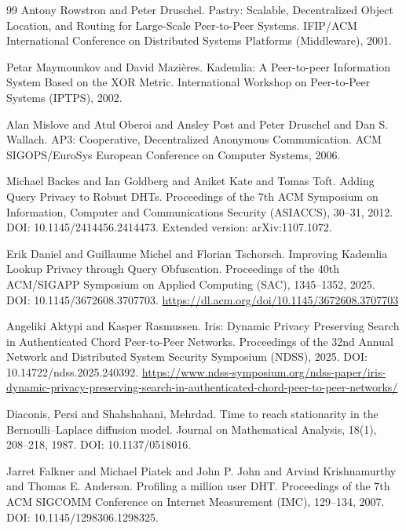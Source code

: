 \documentclass[11pt]{article}
\begin{document}
\begin{thebibliography}{99}
Antony Rowstron and Peter Druschel.
\newblock Pastry: Scalable, Decentralized Object Location, and Routing for Large-Scale Peer-to-Peer Systems.
\newblock IFIP/ACM International Conference on Distributed Systems Platforms (Middleware), 2001.

Petar Maymounkov and David Mazi{\`e}res.
\newblock Kademlia: A Peer-to-peer Information System Based on the XOR Metric.
\newblock International Workshop on Peer-to-Peer Systems (IPTPS), 2002.

Alan Mislove and Atul Oberoi and Ansley Post and Peter Druschel and Dan S. Wallach.
\newblock AP3: Cooperative, Decentralized Anonymous Communication.
\newblock ACM SIGOPS/EuroSys European Conference on Computer Systems, 2006.

Michael Backes and Ian Goldberg and Aniket Kate and Tomas Toft.
\newblock Adding Query Privacy to Robust DHTs.
\newblock Proceedings of the 7th ACM Symposium on Information, Computer and Communications Security (ASIACCS), 30--31, 2012.
\newblock DOI: 10.1145/2414456.2414473.
\newblock Extended version: arXiv:1107.1072.

Erik Daniel and Guillaume Michel and Florian Tschorsch.
\newblock Improving {Kademlia} Lookup Privacy through Query Obfuscation.
\newblock Proceedings of the 40th {ACM}/{SIGAPP} Symposium on Applied Computing (SAC), 1345--1352, 2025.
\newblock DOI: 10.1145/3672608.3707703.
\newblock \url{https://dl.acm.org/doi/10.1145/3672608.3707703}

Angeliki Aktypi and Kasper Rasmussen.
\newblock Iris: Dynamic Privacy Preserving Search in Authenticated Chord Peer-to-Peer Networks.
\newblock Proceedings of the 32nd Annual Network and Distributed System Security Symposium (NDSS), 2025.
\newblock DOI: 10.14722/ndss.2025.240392.
\newblock \url{https://www.ndss-symposium.org/ndss-paper/iris-dynamic-privacy-preserving-search-in-authenticated-chord-peer-to-peer-networks/}

Diaconis, Persi and Shahshahani, Mehrdad.
\newblock Time to reach stationarity in the {B}ernoulli--{L}aplace diffusion model.
 Journal on Mathematical Analysis, 18(1), 208--218, 1987.
\newblock DOI: 10.1137/0518016.

Jarret Falkner and Michael Piatek and John P. John and Arvind Krishnamurthy and Thomas E. Anderson.
\newblock Profiling a million user DHT.
\newblock Proceedings of the 7th ACM SIGCOMM Conference on Internet Measurement (IMC), 129--134, 2007.
\newblock DOI: 10.1145/1298306.1298325.


\end{thebibliography}
\end{document}

